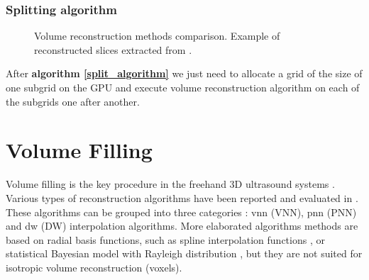 \documentclass[12pt,journal,compsoc]{IEEEtran}
\begin{document}
\subsubsection{Splitting algorithm}

\begin{figure}[hb!]
\centering
{}
\hfil
{}
\hfil
{}
\hfil
{}
\caption{Volume reconstruction methods comparison. Example of reconstructed slices extracted from \cite{2}.}
\label{algo_comparison}
\end{figure}


After \textbf{algorithm \ref{split_algorithm}} we just need to allocate a grid of the size of one subgrid on the GPU and execute volume reconstruction algorithm on each of the subgrids one after another.

\section{Volume Filling}

Volume filling is the key procedure in the freehand 3D ultrasound systems \cite{3,4,6}. Various types of reconstruction algorithms have been reported and evaluated in \cite{10}. These algorithms can be grouped into three categories : \acl{vnn} (VNN), \acl{pnn} (PNN) and \acl{dw} (DW) interpolation algorithms. 
More elaborated algorithms methods are based on radial basis functions, such as spline interpolation functions \cite{11}, or statistical Bayesian model with Rayleigh distribution \cite{12}, but they are not suited for isotropic volume reconstruction (voxels).\par
\end{document}
